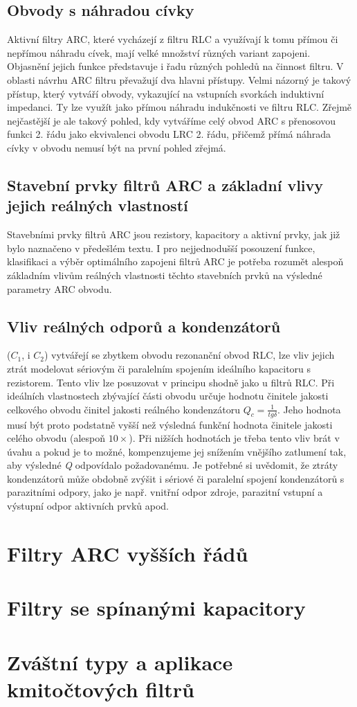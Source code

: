     \subsection{Obvody s náhradou cívky}
      Aktivní filtry ARC, které vycházejí z filtru RLC a využívají k tomu přímou či nepřímou
      náhradu cívek, mají velké množství různých variant zapojeni. Objasnění jejich funkce
      představuje i řadu různých pohledů na činnost filtru. V oblasti návrhu ARC filtru převažují
      dva hlavni přístupy. Velmi názorný je takový přístup, který vytváří obvody, vykazující na
      vstupních svorkách induktivní impedanci. Ty lze využít jako přímou náhradu indukčnosti ve
      filtru RLC. Zřejmě nejčastější je ale takový pohled, kdy vytváříme celý obvod ARC s
      přenosovou funkci 2. řádu jako ekvivalenci obvodu LRC 2. řádu, přičemž přímá náhrada cívky v
      obvodu nemusí být na první pohled zřejmá.

    \subsection{Stavební prvky filtrů ARC a základní vlivy jejich reálných vlastností}
      Stavebními prvky filtrů ARC jsou rezistory, kapacitory a aktivní prvky, jak již bylo
      naznačeno v předešlém textu. I pro nejjednodušší posouzení funkce, klasifikaci a výběr
      optimálního zapojeni filtrů ARC je potřeba rozumět alespoň základním vlivům reálných
      vlastnosti těchto stavebních prvků na výsledné parametry ARC obvodu.

      \subsection{Vliv reálných odporů a kondenzátorů}
        ($C_1$, i $C_2$) vytvářejí se zbytkem obvodu rezonanční obvod RLC, lze vliv jejich ztrát
        modelovat sériovým či paralelním spojením ideálního kapacitoru s rezistorem. Tento vliv lze
        posuzovat v principu shodně jako u filtrů RLC. Při ideálních vlastnostech zbývající části
        obvodu určuje hodnotu činitele jakosti celkového obvodu činitel jakosti reálného
        kondenzátoru $Q_c = \frac{1}{tg\delta}$. Jeho hodnota musí být proto podstatně vyšší než
        výsledná funkční hodnota činitele jakosti celého obvodu (alespoň \(\num{10}\times\)). Při
        nižších hodnotách je třeba tento vliv brát v úvahu a pokud je to možné, kompenzujeme jej
        snížením vnějšího zatlumení tak, aby výsledné \emph{Q} odpovídalo požadovanému. Je potřebné
        si uvědomit, že ztráty kondenzátorů může obdobně zvýšit i sériové či paralelní spojení
        kondenzátorů s parazitními odpory, jako je např. vnitřní odpor zdroje, parazitní vstupní a
        výstupní odpor aktivních prvků apod.
        
  \section{Filtry ARC vyšších řádů}
  \section{Filtry se spínanými kapacitory}
  \section{Zváštní typy a aplikace kmitočtových filtrů}      

